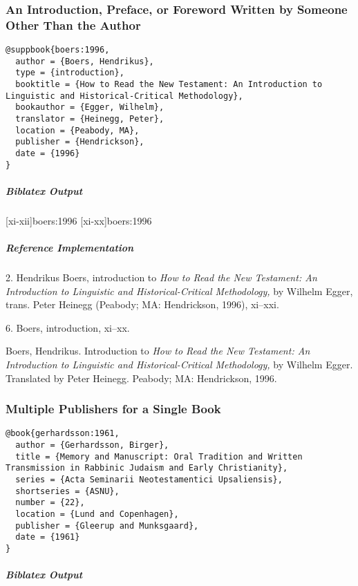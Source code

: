 \documentclass[a4paper]{article}
\newenvironment{biboutput}{%
  \subparagraph{Biblatex Output}
}{\color{black}}
\newenvironment{refimp}{%
  \subparagraph{Reference Implementation}
  \color{reference-colour}
  \rm
}{\par\color{black}}
\begin{document}
\subsubsection{An Introduction, Preface, or Foreword Written by Someone Other
Than the Author}

\begin{lstlisting}
@suppbook{boers:1996,
  author = {Boers, Hendrikus},
  type = {introduction},
  booktitle = {How to Read the New Testament: An Introduction to Linguistic and Historical-Critical Methodology},
  bookauthor = {Egger, Wilhelm},
  translator = {Heinegg, Peter},
  location = {Peabody, MA},
  publisher = {Hendrickson},
  date = {1996}
}
\end{lstlisting}  

\begin{biboutput}
  [xi-xii]{boers:1996}
  [xi-xx]{boers:1996}
\end{biboutput}

\begin{refimp}
  2. Hendrikus Boers, introduction to \emph{How to Read the New Testament: An
  Introduction to Linguistic and Historical-Critical Methodology,} by Wilhelm
  Egger, trans. Peter Heinegg (Peabody; MA: Hendrickson, 1996), xi–xxi.

  6. Boers, introduction, xi–xx.

  \hangindent\bibindent Boers, Hendrikus. Introduction to \emph{How to Read
  the New Testament: An Introduction to Linguistic and Historical-Critical
  Methodology,} by Wilhelm Egger. Translated by Peter Heinegg. Peabody; MA:
  Hendrickson, 1996.
\end{refimp}

\subsubsection{Multiple Publishers for a Single Book}

\begin{lstlisting}
@book{gerhardsson:1961,
  author = {Gerhardsson, Birger},
  title = {Memory and Manuscript: Oral Tradition and Written Transmission in Rabbinic Judaism and Early Christianity},
  series = {Acta Seminarii Neotestamentici Upsaliensis},
  shortseries = {ASNU},
  number = {22},
  location = {Lund and Copenhagen},
  publisher = {Gleerup and Munksgaard},
  date = {1961}
}
\end{lstlisting}

\begin{biboutput}
\end{biboutput}
\end{document}
